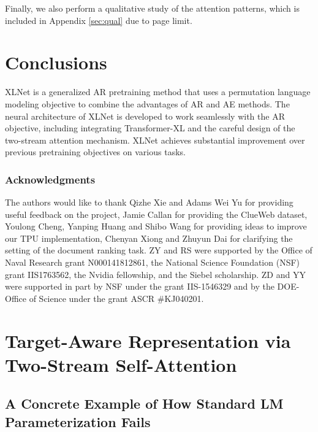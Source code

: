 \documentclass{article}
\begin{document}
Finally, we also perform a qualitative study of the attention patterns, which is included in Appendix \ref{sec:qual} due to page limit.


 
\section{Conclusions}
XLNet is a generalized AR pretraining method that uses a permutation language modeling objective to combine the advantages of AR and AE methods. The neural architecture of XLNet is developed to work seamlessly with the AR objective, including integrating Transformer-XL and the careful design of the two-stream attention mechanism. 
XLNet achieves substantial improvement over previous pretraining objectives on various tasks.
 

\subsubsection*{Acknowledgments}
The authors would like to thank Qizhe Xie and Adams Wei Yu for providing useful feedback on the project, Jamie Callan for providing the ClueWeb dataset, Youlong Cheng, Yanping Huang and Shibo Wang for providing ideas to improve our TPU implementation, Chenyan Xiong and Zhuyun Dai for clarifying the setting of the document ranking task.
ZY and RS were supported by the Office of Naval Research grant N000141812861, the National Science Foundation (NSF) grant IIS1763562, the Nvidia fellowship, and the Siebel scholarship.
ZD and YY were supported in part by NSF under the grant IIS-1546329 and by the DOE-Office of Science under the grant ASCR \#KJ040201.





\newpage
\appendix

\section{Target-Aware Representation via Two-Stream Self-Attention}

\subsection{A Concrete Example of How Standard LM Parameterization Fails}
\label{sec:tgt-aware-example}
\end{document}
